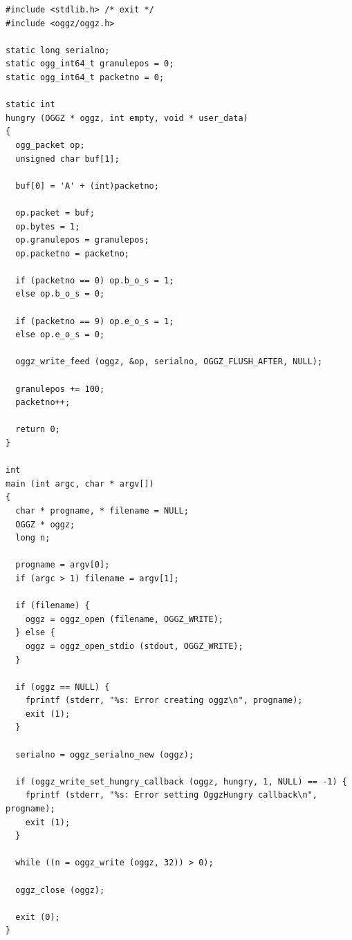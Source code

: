 \footnotesize\begin{verbatim}
#include <stdlib.h> /* exit */
#include <oggz/oggz.h>

static long serialno;
static ogg_int64_t granulepos = 0;
static ogg_int64_t packetno = 0;

static int
hungry (OGGZ * oggz, int empty, void * user_data)
{
  ogg_packet op;
  unsigned char buf[1];

  buf[0] = 'A' + (int)packetno;

  op.packet = buf;
  op.bytes = 1;
  op.granulepos = granulepos;
  op.packetno = packetno;

  if (packetno == 0) op.b_o_s = 1;
  else op.b_o_s = 0;

  if (packetno == 9) op.e_o_s = 1;
  else op.e_o_s = 0;

  oggz_write_feed (oggz, &op, serialno, OGGZ_FLUSH_AFTER, NULL);

  granulepos += 100;
  packetno++;

  return 0;
}

int
main (int argc, char * argv[])
{
  char * progname, * filename = NULL;
  OGGZ * oggz;
  long n;

  progname = argv[0];
  if (argc > 1) filename = argv[1];

  if (filename) {
    oggz = oggz_open (filename, OGGZ_WRITE);
  } else {
    oggz = oggz_open_stdio (stdout, OGGZ_WRITE);
  }

  if (oggz == NULL) {
    fprintf (stderr, "%s: Error creating oggz\n", progname);
    exit (1);
  }

  serialno = oggz_serialno_new (oggz);

  if (oggz_write_set_hungry_callback (oggz, hungry, 1, NULL) == -1) {
    fprintf (stderr, "%s: Error setting OggzHungry callback\n", progname);
    exit (1);
  }

  while ((n = oggz_write (oggz, 32)) > 0);

  oggz_close (oggz);

  exit (0);
}
\end{verbatim}
\normalsize
 


